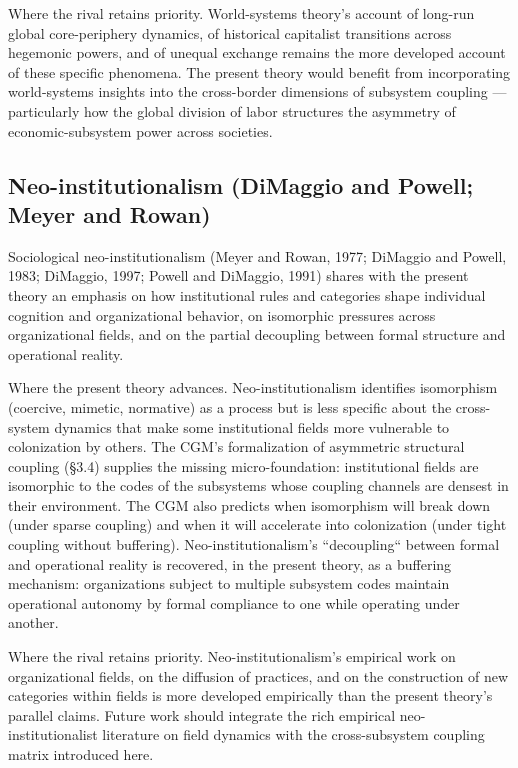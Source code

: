 \documentclass[12pt,a4paper]{article}
\begin{document}
Where the rival retains priority. World-systems theory's account of long-run global core-periphery dynamics, of historical capitalist transitions across hegemonic powers, and of unequal exchange remains the more developed account of these specific phenomena. The present theory would benefit from incorporating world-systems insights into the cross-border dimensions of subsystem coupling --- particularly how the global division of labor structures the asymmetry of economic-subsystem power across societies.

\subsection{Neo-institutionalism (DiMaggio and Powell; Meyer and Rowan)}

Sociological neo-institutionalism (Meyer and Rowan, 1977; DiMaggio and Powell, 1983; DiMaggio, 1997; Powell and DiMaggio, 1991) shares with the present theory an emphasis on how institutional rules and categories shape individual cognition and organizational behavior, on isomorphic pressures across organizational fields, and on the partial decoupling between formal structure and operational reality.


Where the present theory advances. Neo-institutionalism identifies isomorphism (coercive, mimetic, normative) as a process but is less specific about the cross-system dynamics that make some institutional fields more vulnerable to colonization by others. The CGM's formalization of asymmetric structural coupling (§3.4) supplies the missing micro-foundation: institutional fields are isomorphic to the codes of the subsystems whose coupling channels are densest in their environment. The CGM also predicts when isomorphism will break down (under sparse coupling) and when it will accelerate into colonization (under tight coupling without buffering). Neo-institutionalism's ``decoupling`` between formal and operational reality is recovered, in the present theory, as a buffering mechanism: organizations subject to multiple subsystem codes maintain operational autonomy by formal compliance to one while operating under another.


Where the rival retains priority. Neo-institutionalism's empirical work on organizational fields, on the diffusion of practices, and on the construction of new categories within fields is more developed empirically than the present theory's parallel claims. Future work should integrate the rich empirical neo-institutionalist literature on field dynamics with the cross-subsystem coupling matrix introduced here.
\end{document}
